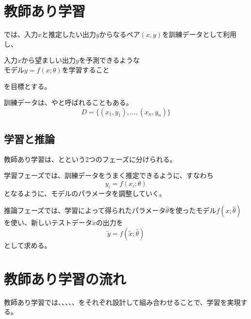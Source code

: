 \documentclass[../../../topic_machine-learning]{subfiles}
\begin{document}
\sectionline
\section{教師あり学習}

では、入力$x$と推定したい出力$y$からなるペア$(x,y)$を訓練データとして利用し、
\begin{emphabox}
  \begin{spacebox}
    \begin{center}
      入力$x$から望ましい出力$y$を予測できるような\\
      モデル$y = f(x; \theta)$を学習すること
    \end{center}
  \end{spacebox}
\end{emphabox}
を目標とする。

\br

訓練データは、やと呼ばれることもある。
\begin{equation*}
  D = \{ (x_1, y_1), \ldots, (x_n, y_n) \}
\end{equation*}

\subsection{学習と推論}

教師あり学習は、とという2つのフェーズに分けられる。

学習フェーズでは、訓練データをうまく推定できるように、すなわち
\begin{equation*}
  y_i = f(x_i; \theta)
\end{equation*}
となるように、モデルのパラメータを調整していく。

\br

推論フェーズでは、学習によって得られたパラメータ$\hat{\theta}$を使ったモデル$f(x;\hat{\theta})$を使い、新しいテストデータ$\tilde{x}$の出力を
\begin{equation*}
  \tilde{y} = f(\tilde{x}; \hat{\theta})
\end{equation*}
として求める。

\sectionline
\section{教師あり学習の流れ}

教師あり学習では、、、、、をそれぞれ設計して組み合わせることで、学習を実現する。
\end{document}
